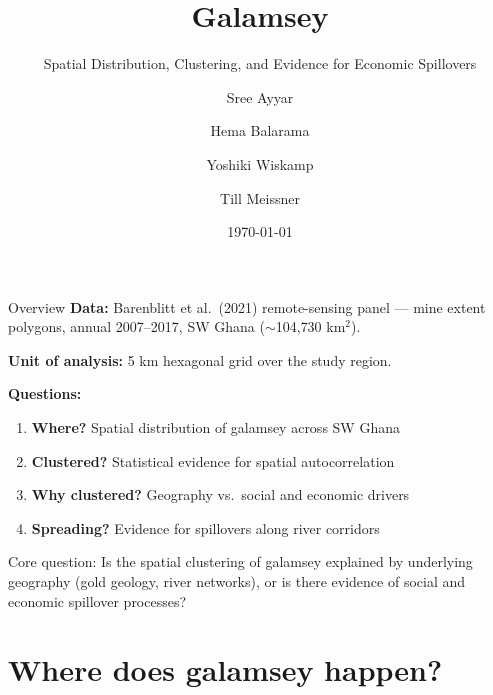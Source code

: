 \documentclass[aspectratio=169,handout]{beamer}
\title{Galamsey}
\subtitle{Spatial Distribution, Clustering, and Evidence for Economic Spillovers}
\author{Sree Ayyar \and Hema Balarama \and Yoshiki Wiskamp \and Till Meissner}
\institute{London School of Economics}
\date{\today}
\begin{document}
\maketitle

\begin{frame}{Overview}
  \textbf{Data:} Barenblitt et al.\ (2021) remote-sensing panel --- mine
  extent polygons, annual 2007--2017, SW Ghana ($\sim$104{,}730 km$^2$).

  \medskip
  \textbf{Unit of analysis:} 5 km hexagonal grid over the study region.

  \medskip
  \textbf{Questions:}
  \begin{enumerate}\setlength\itemsep{0.4em}
    \item \textbf{Where?} Spatial distribution of galamsey across SW Ghana
    \item \textbf{Clustered?} Statistical evidence for spatial autocorrelation
    \item \textbf{Why clustered?} Geography vs.\ social and economic drivers
    \item \textbf{Spreading?} Evidence for spillovers along river corridors
  \end{enumerate}

  \medskip
  \alert{Core question:} Is the spatial clustering of galamsey explained by
  underlying geography (gold geology, river networks), or is there evidence
  of social and economic spillover processes?
\end{frame}

\section{Where does galamsey happen?}
\end{document}
